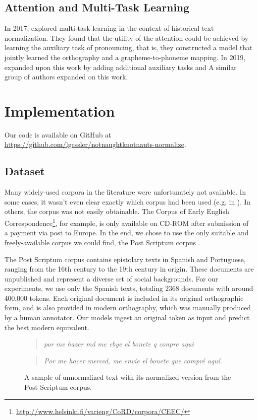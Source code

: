 \documentclass[11pt,a4paper]{article}
\begin{document}
\subsection {Attention and Multi-Task Learning}
In 2017, \citeauthor{bollmann_learning_2017} explored multi-task learning in the context of historical text normalization. They found that the utility of the attention could be achieved by learning the auxiliary task of pronouncing, that is, they constructed a model that jointly learned the orthography and a grapheme-to-phoneme mapping. In 2019, \citeauthor{bollmann_few-shot_2019} expanded upon this work by adding additional auxiliary tasks and  A similar group of authors expanded on this work.

\section{Implementation}
Our code is available on GitHub at \url{https://github.com/lgessler/notnaughtknotnauts-normalize}.

\subsection{Dataset}
Many widely-used corpora in the literature were unfortunately not available. In some cases, it wasn't even clear exactly which corpus had been used (e.g. in \citet{pettersson_spelling_2016}). In others, the corpus was not easily obtainable. The Corpus of Early English Correspondence\footnote{\url{http://www.helsinki.fi/varieng/CoRD/corpora/CEEC/}}, for example, is only available on CD-ROM after submission of a payment via post to Europe. In the end, we chose to use the only suitable and freely-available corpus we could find, the Post Scriptum corpus \cite{vaamonde_post_2014}. 

The Post Scriptum corpus contains epistolary texts in Spanish and Portuguese, ranging from the 16th century to the 19th century in origin. These documents are unpublished and represent a diverse set of social backgrounds. For our experiments, we use only the Spanish texts, totaling 2368 documents with around 400,000 tokens. Each original document is included in its original orthographic form, and is also provided in modern orthography, which was manually produced by a human annotator. Our models ingest an original token as input and predict the best modern equivalent.

\begin{figure}[h]
\begin{quotation}
\noindent \textit{por me hazer md me ebye el bonete q conpre aqui}
\end{quotation}
\begin{quote}
\textit{Por me hacer merced, me envíe el bonete que compré aquí.}
\caption{A sample of unnormalized text with its normalized version from the Post Scriptum corpus.}
\end{quote}
\end{figure}
\end{document}
